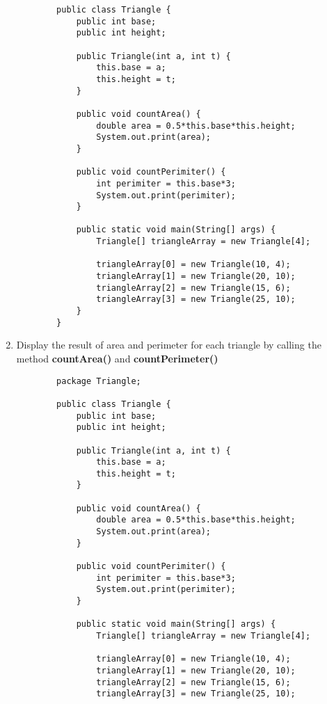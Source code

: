 \documentclass[12pt,titlepage]{article}
\begin{document}
\begin{enumerate}
\begin{verbatim}
        public class Triangle {
            public int base;
            public int height;
            
            public Triangle(int a, int t) {
                this.base = a;
                this.height = t;
            }

            public void countArea() {
                double area = 0.5*this.base*this.height;
                System.out.print(area);
            }

            public void countPerimiter() {
                int perimiter = this.base*3;
                System.out.print(perimiter);
            }

            public static void main(String[] args) {
                Triangle[] triangleArray = new Triangle[4];

                triangleArray[0] = new Triangle(10, 4);
                triangleArray[1] = new Triangle(20, 10);
                triangleArray[2] = new Triangle(15, 6);
                triangleArray[3] = new Triangle(25, 10);
            }
        }
    \end{verbatim}
    \item Display the result of area and perimeter for each triangle by calling the method \textbf{countArea()} and \textbf{countPerimeter()}
    \begin{verbatim}
        package Triangle;

        public class Triangle {
            public int base;
            public int height;
            
            public Triangle(int a, int t) {
                this.base = a;
                this.height = t;
            }

            public void countArea() {
                double area = 0.5*this.base*this.height;
                System.out.print(area);
            }

            public void countPerimiter() {
                int perimiter = this.base*3;
                System.out.print(perimiter);
            }

            public static void main(String[] args) {
                Triangle[] triangleArray = new Triangle[4];

                triangleArray[0] = new Triangle(10, 4);
                triangleArray[1] = new Triangle(20, 10);
                triangleArray[2] = new Triangle(15, 6);
                triangleArray[3] = new Triangle(25, 10);


\end{verbatim}
\end{enumerate}
\end{document}
